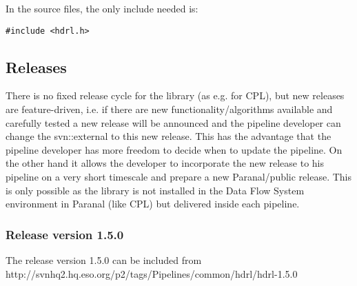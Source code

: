 In the source files, the only include needed is:

\begin{lstlisting}
#include <hdrl.h>
\end{lstlisting}



\begingroup
\let\cleardoublepage\relax
\let\clearpage\relax

\subsection{Releases}
\label{SoftwareInfrastructure:Releases}

There is no fixed release cycle for the \HDRL library (as e.g. for
CPL), but new releases are feature-driven, i.e. if there are new
functionality/algorithms available and carefully tested a new
release will be announced and the pipeline developer can change the
svn::external to this new release. This has the advantage that the
pipeline developer has more freedom to decide when to update the
pipeline. On the other hand it allows the developer to incorporate the
new \HDRL release to his pipeline on a very short timescale and
prepare a new Paranal/public release. This is only possible as the
library is not installed in the Data Flow System environment in
Paranal (like CPL) but delivered inside each pipeline.

\subsubsection{Release version 1.5.0}
The \HDRL release version 1.5.0 can be included from\\

http://svnhq2.hq.eso.org/p2/tags/Pipelines/common/hdrl/hdrl-1.5.0

